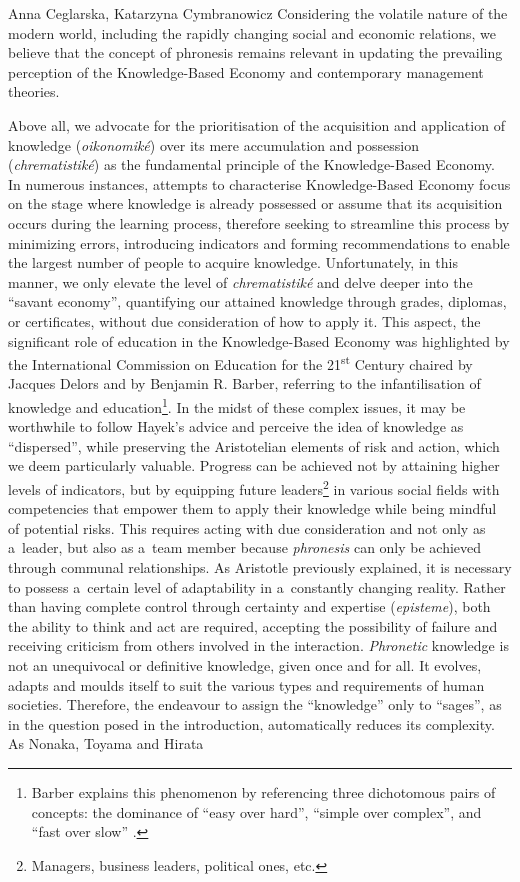 \begin{artengenv2auth}{Anna Ceglarska, Katarzyna Cymbranowicz}
Considering the volatile nature of the modern world, including the rapidly changing social and economic relations, we believe that the concept of phronesis remains relevant in updating the prevailing perception of the Knowledge-Based Economy and contemporary management theories.



Above all, we advocate for the prioritisation of the acquisition and application of knowledge (\textit{oikonomiké}) over its mere accumulation and possession (\textit{chrematistiké}) as the fundamental principle of the Knowledge-Based Economy. In numerous instances, attempts to characterise Knowledge-Based Economy focus on the stage where knowledge is already possessed or assume that its acquisition occurs during the learning process, therefore seeking to streamline this process by minimizing errors, introducing indicators and forming recommendations to enable the largest number of people to acquire knowledge. Unfortunately, in this manner, we only elevate the level of \textit{chrematistiké} and delve deeper into the ``savant economy'', quantifying our attained knowledge through grades, diplomas, or certificates, without due consideration of how to apply it. This aspect, the significant role of education in the Knowledge-Based Economy was highlighted by the International Commission on Education for the 21\textsuperscript{st} Century chaired by Jacques Delors and by Benjamin R. Barber, referring to the infantilisation of knowledge and education\footnote{Barber explains this phenomenon by referencing three dichotomous pairs of concepts: the dominance of ``easy over hard'', ``simple over complex'', and ``fast over slow'' 
\parencite[][pp.85–107]{barber_consumed_2008}.%
}. In the midst of these complex issues, it may be worthwhile to follow Hayek's advice and perceive the idea of knowledge as ``dispersed'', while preserving the Aristotelian elements of risk and action, which we deem particularly valuable. Progress can be achieved not by attaining higher levels of indicators, but by equipping future leaders\footnote{Managers, business leaders, political ones, etc.} in various social fields with competencies that empower them to apply their knowledge while being mindful of potential risks. This requires acting with due consideration and not only as a~leader, but also as a~team member because \textit{phronesis} can only be achieved through communal relationships. As Aristotle previously explained, it is necessary to possess a~certain level of adaptability in a~constantly changing reality. Rather than having complete control through certainty and expertise (\textit{episteme}), both the ability to think and act are required, accepting the possibility of failure and receiving criticism from others involved in the interaction. \textit{Phronetic} knowledge is not an unequivocal or definitive knowledge, given once and for all. It evolves, adapts and moulds itself to suit the various types and requirements of human societies. Therefore, the endeavour to assign the ``knowledge'' only to ``sages'', as in the question posed in the introduction, automatically reduces its complexity. As Nonaka, Toyama and Hirata 

\end{artengenv2auth}

